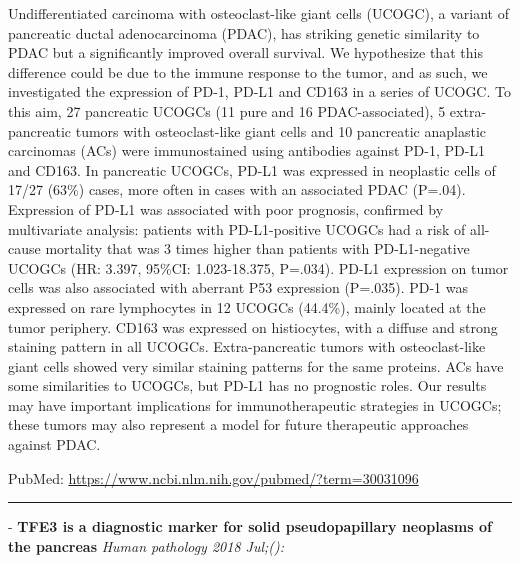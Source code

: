 \documentclass[]{article}
\begin{document}
Undifferentiated carcinoma with osteoclast-like giant cells (UCOGC), a
variant of pancreatic ductal adenocarcinoma (PDAC), has striking genetic
similarity to PDAC but a significantly improved overall survival. We
hypothesize that this difference could be due to the immune response to
the tumor, and as such, we investigated the expression of PD-1, PD-L1
and CD163 in a series of UCOGC. To this aim, 27 pancreatic UCOGCs (11
pure and 16 PDAC-associated), 5 extra-pancreatic tumors with
osteoclast-like giant cells and 10 pancreatic anaplastic carcinomas
(ACs) were immunostained using antibodies against PD-1, PD-L1 and CD163.
In pancreatic UCOGCs, PD-L1 was expressed in neoplastic cells of 17/27
(63\%) cases, more often in cases with an associated PDAC (P=.04).
Expression of PD-L1 was associated with poor prognosis, confirmed by
multivariate analysis: patients with PD-L1-positive UCOGCs had a risk of
all-cause mortality that was 3 times higher than patients with
PD-L1-negative UCOGCs (HR: 3.397, 95\%CI: 1.023-18.375, P=.034). PD-L1
expression on tumor cells was also associated with aberrant P53
expression (P=.035). PD-1 was expressed on rare lymphocytes in 12 UCOGCs
(44.4\%), mainly located at the tumor periphery. CD163 was expressed on
histiocytes, with a diffuse and strong staining pattern in all UCOGCs.
Extra-pancreatic tumors with osteoclast-like giant cells showed very
similar staining patterns for the same proteins. ACs have some
similarities to UCOGCs, but PD-L1 has no prognostic roles. Our results
may have important implications for immunotherapeutic strategies in
UCOGCs; these tumors may also represent a model for future therapeutic
approaches against PDAC.

PubMed: \url{https://www.ncbi.nlm.nih.gov/pubmed/?term=30031096}

{}

{}

\begin{center}\rule{0.5\linewidth}{\linethickness}\end{center}

 - \textbf{TFE3 is a diagnostic marker for solid pseudopapillary
neoplasms of the pancreas} \emph{Human pathology 2018 Jul;():}
\end{document}
